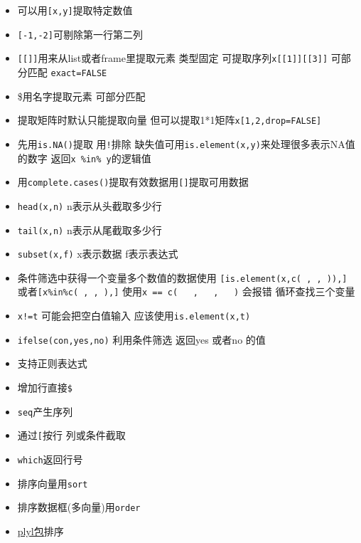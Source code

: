 \documentclass[]{book}
\providecommand{\tightlist}{%
  \setlength{\itemsep}{0pt}\setlength{\parskip}{0pt}}
\begin{document}
\begin{itemize}
\tightlist
\item
  可以用\texttt{{[}x,y{]}}提取特定数值
\item
  \texttt{{[}-1,-2{]}}可剔除第一行第二列
\item
  \texttt{{[}{[}{]}{]}}用来从list或者frame里提取元素 类型固定 可提取序列\texttt{x{[}{[}1{]}{]}{[}{[}3{]}{]}} 可部分匹配 \texttt{exact=FALSE}
\item
  \$用名字提取元素 可部分匹配
\item
  提取矩阵时默认只能提取向量 但可以提取1*1矩阵\texttt{x{[}1,2,drop=FALSE{]}}
\item
  先用\texttt{is.NA()}提取 用\texttt{!}排除 缺失值可用\texttt{is.element(x,y)}来处理很多表示NA值的数字 返回\texttt{x\ \%in\%\ y}的逻辑值
\item
  用\texttt{complete.cases()}提取有效数据用\texttt{{[}{]}}提取可用数据
\item
  \texttt{head(x,n)} n表示从头截取多少行
\item
  \texttt{tail(x,n)} n表示从尾截取多少行
\item
  \texttt{subset(x,f)} x表示数据 f表示表达式
\item
  条件筛选中获得一个变量多个数值的数据使用 \texttt{{[}is.element(x,c(\textquotesingle{}\ \textquotesingle{},\textquotesingle{}\ \textquotesingle{},\textquotesingle{}\ \textquotesingle{})),{]}} 或者\texttt{{[}x\%in\%c(\textquotesingle{}\ \textquotesingle{},\textquotesingle{}\ \textquotesingle{},\textquotesingle{}\ \textquotesingle{}),{]}} 使用\texttt{x\ ==\ c(\ \textquotesingle{}\ \textquotesingle{}\ ,\ \textquotesingle{}\ \textquotesingle{}\ ,\ \textquotesingle{}\ \textquotesingle{}\ )} 会报错 循环查找三个变量
\item
  \texttt{x!=\textquotesingle{}t\textquotesingle{}} 可能会把空白值输入 应该使用\texttt{is.element(x,\textquotesingle{}t\textquotesingle{})}
\item
  \texttt{ifelse(con,yes,no)} 利用条件筛选 返回yes 或者no 的值
\item
  支持正则表达式
\item
  增加行直接\texttt{\$}
\item
  \texttt{seq}产生序列
\item
  通过\texttt{{[}}按行 列或条件截取
\item
  \texttt{which}返回行号
\item
  排序向量用\texttt{sort}
\item
  排序数据框(多向量)用\texttt{order}
\item
  \href{http://plyr.had.co.nz/09-user/}{plyl包}排序
\end{itemize}
\end{document}
